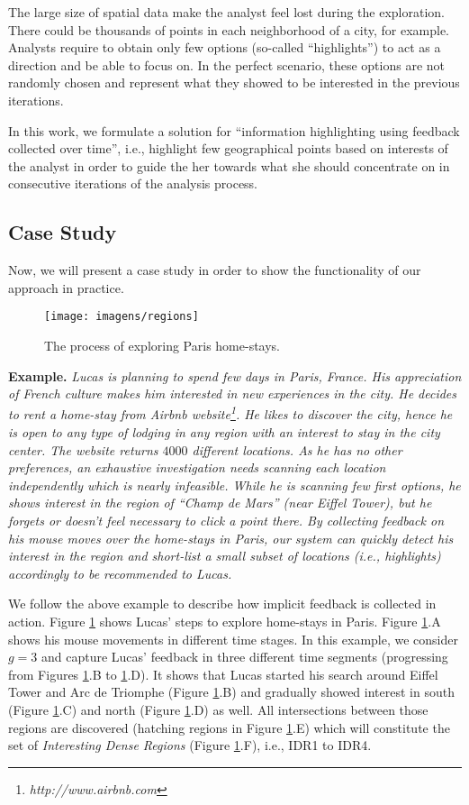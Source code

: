 The large size of spatial data make the analyst feel lost during the exploration. There could be thousands of points in each neighborhood of a city, for example. Analysts require to obtain only few options (so-called ``highlights'') to act as a direction and be able to focus on. In the perfect scenario, these options are not randomly chosen and represent what they showed to be interested in the previous iterations.

In this work, we formulate a solution for ``information highlighting using feedback collected over time'', i.e., highlight few geographical points based on interests of the analyst in order to guide the her towards what she should concentrate on in consecutive iterations of the analysis process.

\subsection{Case Study}

Now, we will present a case study in order to show the functionality of our approach in practice.

\begin{figure}[t]
	\centering
	\texttt{[image: imagens/regions]}
	\caption{The process of exploring Paris home-stays.}
	\label{fig:regions}
\end{figure}

{\bf Example.} {\em Lucas is planning to spend few days in Paris, France. His appreciation of French culture makes him interested in new experiences in the city. He decides to rent a home-stay from Airbnb website\footnote{\it http://www.airbnb.com}. He likes to discover the city, hence he is open to any type of lodging in any region with an interest to stay in the city center. The website returns $4000$ different locations. As he has no other preferences, an exhaustive investigation needs scanning each location independently which is nearly infeasible. While he is scanning few first options, he shows interest in the region of ``Champ de Mars'' (near Eiffel Tower), but he forgets or doesn't feel necessary to click a point there. By collecting feedback on his mouse moves over the home-stays in Paris, our system can quickly detect his interest in the region and short-list a small subset of locations (i.e., highlights) accordingly to be recommended to Lucas.}

We follow the above example to describe how implicit feedback is collected in action. Figure \ref{fig:regions} shows Lucas' steps to explore home-stays in Paris. Figure \ref{fig:regions}.A shows his mouse movements in different time stages. In this example, we consider $g = 3$ and capture Lucas' feedback in three different time segments (progressing from Figures \ref{fig:regions}.B to \ref{fig:regions}.D). It shows that Lucas started his search around Eiffel Tower and Arc de Triomphe (Figure \ref{fig:regions}.B) and gradually showed interest in south (Figure \ref{fig:regions}.C) and north (Figure \ref{fig:regions}.D) as well. All intersections between those regions are discovered (hatching regions in Figure \ref{fig:regions}.E) which will constitute the set of {\em Interesting Dense Regions} (Figure \ref{fig:regions}.F), i.e., IDR1 to IDR4.

